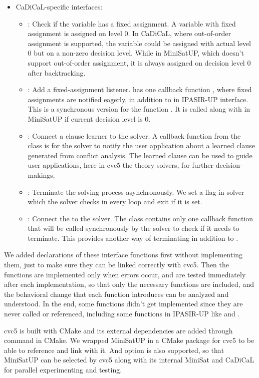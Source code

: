 \begin{itemize}
  \item CaDiCaL-specific interfaces:
  \begin{itemize}
    \item {}: Check if the variable has a fixed assignment. A variable with fixed assignment is assigned on level 0. In CaDiCaL, where out-of-order assignment is supported, the variable could be assigned with actual level 0 but on a non-zero decision level. While in MiniSatUP, which doesn't support out-of-order assignment, it is always assigned on decision level 0 after backtracking.
    \item {}: Add a fixed-assignment listener.  has one callback function , where fixed assignments are notified eagerly, in addition to  in IPASIR-UP interface. This is a synchronous version for the function . It is called along with  in MiniSatUP if current decision level is 0.
    \item {}: Connect a clause learner to the solver. A callback function  from the  class is for the solver to notify the user application about a learned clause generated from conflict analysis. The learned clause can be used to guide user applications, here in cvc5 the theory solvers, for further decision-makings.
    \item {}: Terminate the solving process asynchronously. We set a flag in solver which the solver checks in every loop and exit if it is set.
    \item {}: Connect the  to the solver. The  class contains only one callback function  that will be called synchronously by the solver to check if it needs to terminate. This provides another way of terminating in addition to .
  \end{itemize}
\end{itemize}

We added declarations of these interface functions first without implementing them, just to make sure they can be linked correctly with cvc5. Then the functions are implemented only when errors occur, and are tested immediately after each implementation, so that only the necessary functions are included, and the behavioral change that each function introduces can be analyzed and understood. In the end, some functions didn't get implemented since they are never called or referenced, including some functions in IPASIR-UP like  and .

cvc5 is built with CMake and its external dependencies are added through command  in CMake. We wrapped MiniSatUP in a CMake package for cvc5 to be able to reference and link with it. And option  is also supported, so that MiniSatUP can be selected by cvc5 along with its internal MiniSat and CaDiCaL for parallel experimenting and testing.
